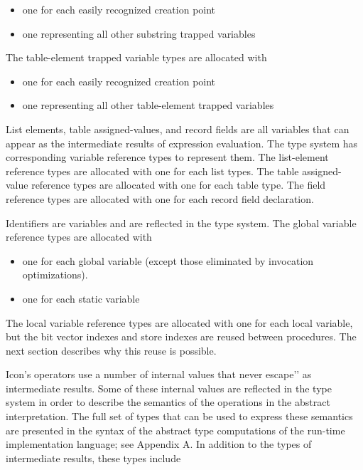 \liststyleLxxx
\begin{itemize}
\item 
one for each easily recognized creation point 
\item 
one representing all other substring trapped variables 
\end{itemize}

The table-element trapped variable types are allocated with 

\liststyleLxxxi
\begin{itemize}
\item 
one for each easily recognized creation point 
\item 
one representing all other table-element trapped variables 
\end{itemize}

List elements, table assigned-values, and record fields are all
variables that can appear as the intermediate results of expression
evaluation. The type system has corresponding variable reference types
to represent them. The list-element reference types are allocated with
one for each list types. The table assigned-value reference types are
allocated with one for each table type. The field reference types are
allocated with one for each record field declaration.

Identifiers are variables and are reflected in the type system. The
global variable reference types are allocated with

\liststyleLxxxii
\begin{itemize}
\item 
one for each global variable (except those eliminated by invocation optimizations). 
\item 
one for each static variable 
\end{itemize}

The local variable reference types are allocated with one for each
local variable, but the bit vector indexes and store indexes are
reused between procedures. The next section describes why this reuse
is possible.

Icon's operators use a number of internal values that never
{\textasciigrave}{\textasciigrave}escape'{}' as intermediate
results. Some of these internal values are reflected in the type
system in order to describe the semantics of the operations in the
abstract interpretation. The full set of types that can be used to
express these semantics are presented in the syntax of the abstract
type computations of the run-time implementation language; see
Appendix A. In addition to the types of intermediate results, these
types include

